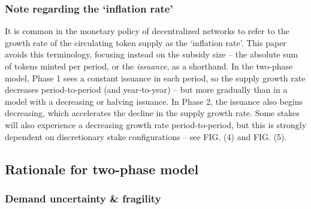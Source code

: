 \documentclass[longbibliography,nofootinbib]{revtex4-1}
\begin{document}
\subsubsection{Note regarding the `inflation rate'}

It is common in the monetary policy of decentralized networks to refer to the growth rate of the circulating token supply as the `inflation rate'. This paper avoids this terminology, focusing instead on the subsidy size – the absolute sum of tokens minted per period, or the \textit{issuance}, as a shorthand. In the two-phase model, Phase 1 sees a constant issuance in each period, so the supply growth rate decreases period-to-period (and year-to-year) – but more gradually than in a model with a decreasing or halving issuance. In Phase 2, the issuance also begins decreasing, which accelerates the decline in the supply growth rate. Some stakes will also experience a decreasing growth rate period-to-period, but this is strongly dependent on discretionary stake configurations – see FIG. (4) and FIG. (5). 

\subsection{Rationale for two-phase model}

\subsubsection{Demand uncertainty \& fragility}\label{demand}
\end{document}
